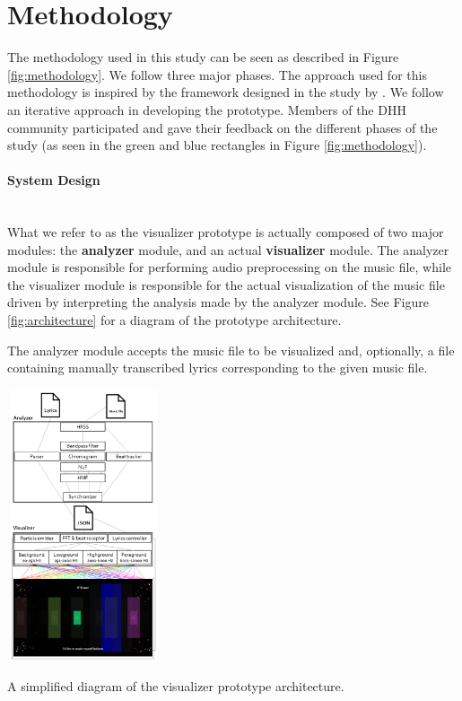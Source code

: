 \documentclass{sigchi-ext}
\begin{document}
\section{Methodology}
The methodology used in this study can be seen as described in Figure \ref{fig:methodology}. We follow three major phases. The approach used for this methodology is inspired by the framework designed in the study by \cite{deja2019myosl}. We follow an iterative approach in developing the prototype. Members of the DHH community participated and gave their feedback on the different phases of the study (as seen in the green and blue rectangles in Figure \ref{fig:methodology}).

\paragraph{System Design}\mbox{} \\
What we refer to as the visualizer prototype is actually composed of two major modules: the \textbf{analyzer} module, and an actual \textbf{visualizer} module. The analyzer module is responsible for performing audio preprocessing on the music file, while the visualizer module is responsible for the actual visualization of the music file driven by interpreting the analysis made by the analyzer module. See Figure \ref{fig:architecture} for a diagram of the prototype architecture.



The analyzer module accepts the music file to be visualized and, optionally, a file containing manually transcribed lyrics corresponding to the given music file. 

\begin{marginfigure}[-2pc]
\begin{minipage}{\marginparwidth}
     \includegraphics[width=4.5cm,height=8cm]{figures/ArchitectureLBW.png}
    \caption{A simplified diagram of the visualizer prototype architecture.}
    \label{fig:architecture}
    \end{minipage}
\end{marginfigure}
\end{document}
